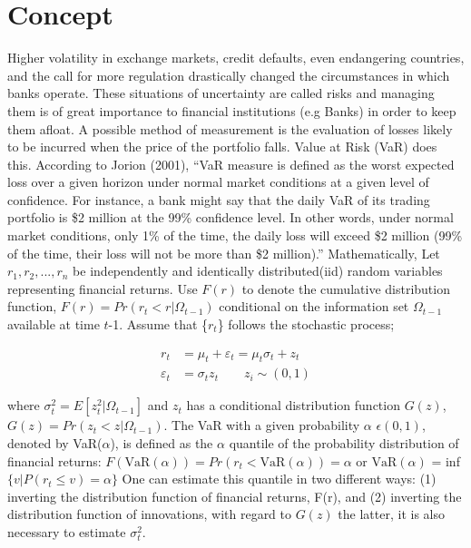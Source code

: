 \documentclass[a4paper,11pt,oneside]{book}
\begin{document}
\section{Concept}
Higher volatility in exchange markets, credit defaults, even endangering countries, and the call for more regulation drastically changed the circumstances in which banks operate. These situations of uncertainty are called risks and managing them is of great importance to financial institutions (e.g Banks) in order to keep them afloat. A possible method of measurement is the evaluation of losses likely to be incurred when the price of the portfolio falls. Value at Risk (VaR) does this.
\newline\newline
According to Jorion (2001), “VaR measure is defined as the worst
expected loss over a given horizon under normal market conditions
at a given level of confidence. For instance, a bank might say that
the daily VaR of its trading portfolio is \$2 million at the 99\%
confidence level. In other words, under normal market conditions,
only 1\% of the time, the daily loss will exceed \$2 million (99\% of the time, their loss will not be more than \$2 million).”
\newline\newline
Mathematically,\newline\newline
Let $r_1, r_2, ..., r_n$ be independently and identically distributed(iid) random variables representing financial returns. Use $F(r)$ to denote the cumulative distribution function,
$F(r) = Pr(r_{t} < r|\Omega_{t-1})$ conditional on the information set $\Omega_{t-1}$ available at time $t$-1. Assume that \{$r_t$\} follows the stochastic process; \newline

\begin{equation}
\begin{aligned}
r_t &= \mu_t + \varepsilon_t =\mu_t \sigma_t + z_t
\\
\varepsilon_t &= \sigma_t  z_t \qquad   z_i \sim (0,1)
\label{1}
\end{aligned}
\end{equation}

where $\sigma^2_t = E[z^2_t|\Omega_{t-1}]$ and $z_t$ has a conditional distribution function $G(z)$, $G(z) = Pr(z_t < z|\Omega_{t-1})$. The VaR with a given probability $\alpha$ $\epsilon(0,1)$, denoted by VaR($\alpha$), is defined as the $\alpha$ quantile of the probability distribution of financial returns:\newline
$F(\text{VaR}(\alpha))=Pr(r_t < \text{VaR}(\alpha))=\alpha$ or $\text{VaR}(\alpha)$ = inf$\{v|P(r_t \leq v)= \alpha\}$
\newline\newline
One can estimate this quantile in two different ways: (1) inverting the distribution function of financial returns, F(r), and (2)
inverting the distribution function of innovations, with regard to
$G(z)$ the latter, it is also necessary to estimate $\sigma^2_t$.
\end{document}
